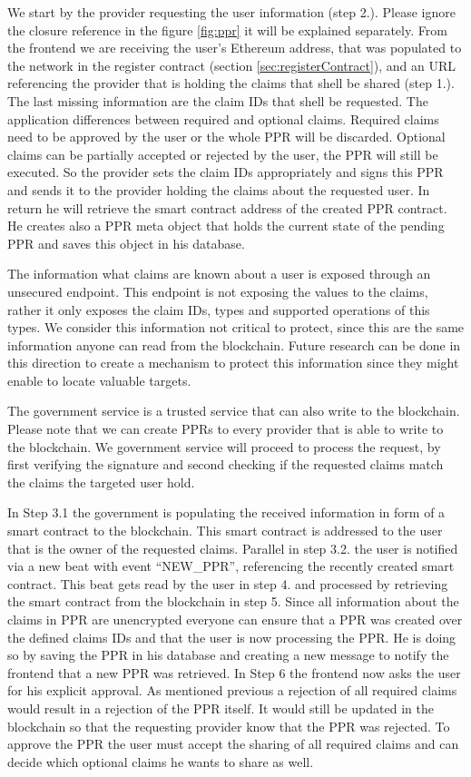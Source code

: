 We start by the provider requesting the user information (step 2.). Please ignore the closure reference in the figure \ref{fig:ppr} it will be explained separately. From the frontend we are receiving the user’s Ethereum address, that was populated to the network in the register contract (section \ref{sec:registerContract}), and an URL referencing the provider that is holding the claims that shell be shared (step 1.). The last missing information are the claim IDs that shell be requested. The application differences between required and optional claims. Required claims need to be approved by the user or the whole PPR will be discarded. Optional claims can be partially accepted or rejected by the user, the PPR will still be executed. So the provider sets the claim IDs appropriately and signs this PPR and sends it to the provider holding the claims about the requested user. In return he will retrieve the smart contract address of the created PPR contract. He creates also a PPR meta object that holds the current state of the pending PPR and saves this object in his database.

The information what claims are known about a user is exposed through an unsecured endpoint. This endpoint is not exposing the values to the claims, rather it only exposes the claim IDs, types and supported operations of this types. We consider this information not critical to protect, since this are the same information anyone can read from the blockchain. Future research can be done in this direction to create a mechanism to protect this information since they might enable to locate valuable targets. 

The government service is a trusted service that can also write to the blockchain. Please note that we can create PPRs to every provider that is able to write to the blockchain. We government service will proceed to process the request, by first verifying the signature and second checking if the requested claims match the claims the targeted user hold.  

In Step 3.1 the government is populating the received information in form of a smart contract to the blockchain. This smart contract is addressed to the user that is the owner of the requested claims. Parallel in step 3.2. the user is notified via a new beat with event “NEW\_PPR”, referencing the recently created smart contract.
This beat gets read by the user in step 4. and processed by retrieving the smart contract from the blockchain in step 5. Since all information about the claims in PPR are unencrypted everyone can ensure that a PPR was created over the defined claims IDs and that the user is now processing the PPR. He is doing so by saving the PPR in his database and creating a new message to notify the frontend that a new PPR was retrieved. In Step 6 the frontend now asks the user for his explicit approval. As mentioned previous a rejection of all required claims would result in a rejection of the PPR itself. It would still be updated in the blockchain so that the requesting provider know that the PPR was rejected. To approve the PPR the user must accept the sharing of all required claims and can decide which optional claims he wants to share as well.  

